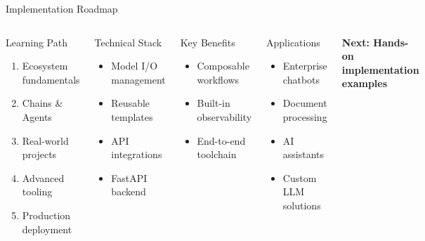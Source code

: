 \documentclass[8pt]{beamer}
\begin{document}
\begin{frame}{Implementation Roadmap}
  \begin{columns}[T]
    \begin{block}{Learning Path}
      \begin{enumerate}
        \item Ecosystem fundamentals
        \item Chains \& Agents
        \item Real-world projects
        \item Advanced tooling
        \item Production deployment
      \end{enumerate}
    \end{block}
    
    \begin{block}{Technical Stack}
      \begin{itemize}
        \item Model I/O management
        \item Reusable templates
        \item API integrations
        \item FastAPI backend
      \end{itemize}
    \end{block}
    
    \begin{block}{Key Benefits}
      \begin{itemize}
        \item Composable workflows
        \item Built-in observability
        \item End-to-end toolchain
      \end{itemize}
    \end{block}
    
    \begin{alertblock}{Applications}
      \begin{itemize}
        \item Enterprise chatbots
        \item Document processing
        \item AI assistants
        \item Custom LLM solutions
      \end{itemize}
    \end{alertblock}
    
    \vspace{0.5cm}
    \centering
    \textcolor{westernpurple}{\textbf{Next: Hands-on implementation examples}}
  \end{columns}
\end{frame}
\end{document}
